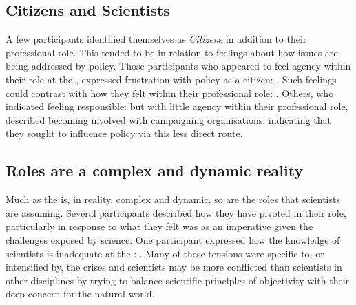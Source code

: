 
\subsection{Citizens and Scientists}

A few participants identified themselves as \emph{Citizen}s in addition to their professional role. This tended to be in relation to feelings about how \CAN{} issues are being addressed by policy. Those participants who appeared to feel agency within their role at the \SPI, expressed frustration with policy as a citizen: . Such feelings could contrast with how they felt within their professional role: . Others, who indicated feeling responsible:  but with little agency within their professional role, described becoming involved with campaigning organisations, indicating that they sought to influence policy via this less direct route.

\subsection{Roles are a complex and dynamic reality}

Much as the \SPI{} is, in reality, complex and dynamic, so are the roles that scientists are assuming. Several participants described how they have pivoted in their role, particularly in response to what they felt was as an imperative given the challenges exposed by \CAN{} science. %
One participant expressed how the knowledge of scientists is inadequate at the \CAN{} \SPI: . Many of these tensions were specific to, or intensified by, the \CAN{} crises and \CAN{} scientists may be more conflicted than scientists in other disciplines by trying to balance scientific principles of objectivity with their deep concern for the natural world.

